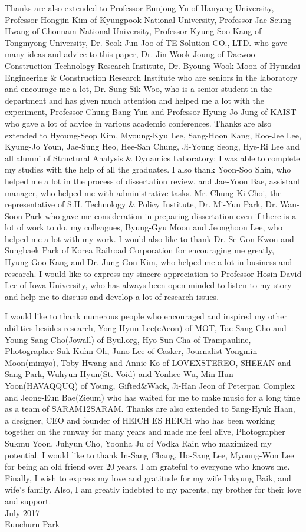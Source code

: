 Thanks are also extended to Professor Eunjong Yu of Hanyang University, Professor Hongjin Kim of Kyungpook National University, Professor Jae-Seung Hwang of Chonnam National University, Professor Kyung-Soo Kang of Tongmyong University, Dr. Seok-Jun Joo of TE Solution CO., LTD. who gave many ideas and advice to this paper, Dr. Jin-Wook Joung of Daewoo Construction Technology Research Institute, Dr. Byoung-Wook Moon of Hyundai Engineering \& Construction Research Institute who are seniors in the laboratory and encourage me a lot, Dr. Sung-Sik Woo, who is a senior student in the department and has given much attention and helped me a lot with the experiment, Professor Chung-Bang Yun and Professor Hyung-Jo Jung of KAIST who gave a lot of advice in various academic conferences. Thanks are also extended to Hyoung-Seop Kim, Myoung-Kyu Lee, Sang-Hoon Kang, Roo-Jee Lee, Kyung-Jo Youn, Jae-Sung Heo, Hee-San Chung, Ji-Young Seong, Hye-Ri Lee and all alumni of Structural Analysis \& Dynamics Laboratory; I was able to complete my studies with the help of all the graduates. I also thank Yoon-Soo Shin, who helped me a lot in the process of dissertation review, and Jae-Yoon Bae, assistant manager, who helped me with administrative tasks. Mr. Chung-Ki Choi, the representative of S.H. Technology \& Policy Institute, Dr. Mi-Yun Park, Dr. Wan-Soon Park who gave me consideration in preparing dissertation even if there is a lot of work to do, my colleagues, Byung-Gyu Moon and Jeonghoon Lee, who helped me a lot with my work. I would also like to thank Dr. Se-Gon Kwon and Sungbaek Park of Korea Railroad Corporation for encouraging me greatly, Hyung-Goo Kang and Dr. Jung-Gon Kim, who helped me a lot in business and research. I would like to express my sincere appreciation to Professor Hosin David Lee of Iowa University, who has always been open minded to listen to my story and help me to discuss and develop a lot of research issues.

I would like to thank numerous people who encouraged and inspired my other abilities besides research, Yong-Hyun Lee(eAeon) of MOT, Tae-Sang Cho and Young-Sang Cho(Jowall) of Byul.org, Hyo-Sun Cha of Trampauline, Photographer Suk-Kuhn Oh, Juno Lee of Casker, Journalist Yongmin Moon(mimyo), Toby Hwang and Annie Ko of LOVEXSTEREO, SHEEAN and Sang Park, Wuhyun Hyun(St. Void) and Yonhee Wu, Min-Hun Yoon(HAVAQQUQ) of Young, Gifted\&Wack, Ji-Han Jeon of Peterpan Complex and Jeong-Eun Bae(Zieum) who has waited for me to make music for a long time as a team of SARAM12SARAM. Thanks are also extended to Sang-Hyuk Haan, a designer, CEO and founder of HEICH ES HEICH who has been working together on the runway for many years and made me feel alive, Photographer Sukmu Yoon, Juhyun Cho, Yoonha Ju of Vodka Rain who maximized my potential. I would like to thank In-Sang Chang, Ho-Sang Lee, Myoung-Won Lee for being an old friend over 20 years. I am grateful to everyone who knows me. Finally, I wish to express my love and gratitude for my wife Inkyung Baik, and wife's family. Also, I am greatly indebted to my parents, my brother for their love and support.
\\
\hspace*{\fill} July 2017\\
\hspace*{\fill} Eunchurn Park
